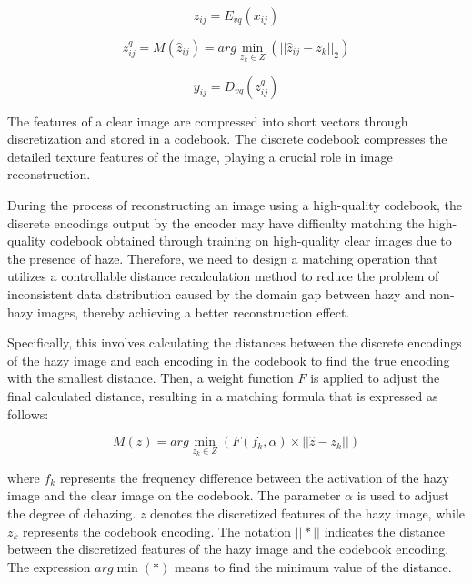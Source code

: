 \documentclass[lettersize,journal]{IEEEtran}
\begin{document}
\begin{equation}
\label{vq_equation_1}
z_{ij} = E_{vq}(x_{ij})
\end{equation}

\begin{equation}
\label{vq_equation_2}
z_{ij}^{q} = M(\widehat{z}_{ij}) = arg \min_{z_{k} \in Z} (|| \widehat{z}_{ij} - z_{k} ||_{2})
\end{equation}

\begin{equation}
\label{vq_equation_3}
y_{ij} = D_{vq}(z_{ij}^{q})
\end{equation}

The features of a clear image are compressed into short vectors through discretization and stored in a codebook. The discrete codebook compresses the detailed texture features of the image, playing a crucial role in image reconstruction.

During the process of reconstructing an image using a high-quality codebook, the discrete encodings output by the encoder may have difficulty matching the high-quality codebook obtained through training on high-quality clear images due to the presence of haze. Therefore, we need to design a matching operation that utilizes a controllable distance recalculation method to reduce the problem of inconsistent data distribution caused by the domain gap between hazy and non-hazy images, thereby achieving a better reconstruction effect.

Specifically, this involves calculating the distances between the discrete encodings of the hazy image and each encoding in the codebook to find the true encoding with the smallest distance. Then, a weight function $F$ is applied to adjust the final calculated distance, resulting in a matching formula that is expressed as follows:

\begin{equation}
	\label{codebook_matching_equation_2}
	M(z) = arg \min_{z_{k} \in Z} (F(f_{k}, \alpha) \times || \widehat{z} - z_{k} ||)
\end{equation}

\noindent where $f_{k}$ represents the frequency difference between the activation of the hazy image and the clear image on the codebook. The parameter $ \alpha $ is used to adjust the degree of dehazing. $z$ denotes the discretized features of the hazy image, while $z_{k}$ represents the codebook encoding. The notation $||*||$ indicates the distance between the discretized features of the hazy image and the codebook encoding. The expression $arg \min(*)$ means to find the minimum value of the distance.
\end{document}
